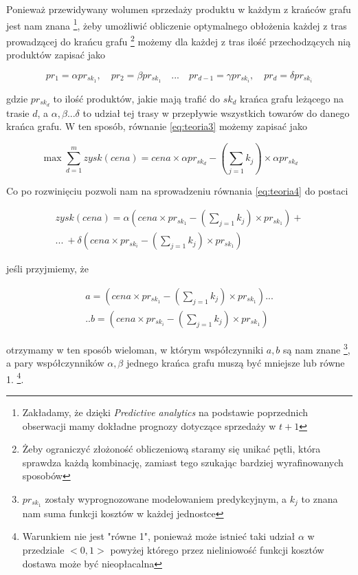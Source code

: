 \documentclass{article}
\begin{document}
Ponieważ przewidywany wolumen sprzedaży produktu w każdym z krańców grafu jest nam znana  \footnote{Zakładamy, że dzięki \textit{Predictive analytics} na podstawie poprzednich obserwacji mamy dokładne prognozy dotyczące sprzedaży w $t+1$}, żeby umożliwić obliczenie optymalnego obłożenia każdej z tras prowadzącej do krańcu grafu \footnote{Żeby ograniczyć złożoność obliczeniową staramy się unikać pętli, która sprawdza każdą kombinację, zamiast tego szukając bardziej wyrafinowanych sposobów} możemy dla każdej z tras ilość przechodzących nią produktów zapisać jako 

\begin{equation*}
pr_1 = \alpha pr_{sk_1} , \quad pr_2 = \beta pr_{sk_1} \quad ... \quad  pr_{d-1} = \gamma pr_{sk_i} ,\quad  pr_d = \delta  pr_{sk_i}
\end{equation*}



gdzie $pr_{sk_d}$ to ilość produktów, jakie mają trafić do $sk_d$ krańca grafu leżącego na trasie $d$, a $\alpha,\beta...\delta$ to udział tej trasy w przepływie wszystkich towarów do danego krańca grafu. W ten sposób, równanie  \ref{eq:teoria3} możemy zapisać jako 

\begin{equation} \label{eq:teoria4}
\max \sum\limits_{d=1}^m  zysk(cena) = 
cena \times \alpha pr_{sk_d}-  ( \sum\limits_{j=1} k_j) \times \alpha pr_{sk_d} \qquad 
\end{equation}

Co po rozwinięciu pozwoli nam na sprowadzeniu równania \ref{eq:teoria4} do postaci

\begin{multline} \label{eq:teoria5}
zysk(cena) = \alpha(cena \times pr_{sk_1} - ( \sum\limits_{j=1} k_j) \times pr_{sk_1}) + \\
 ... \ + \delta(cena \times pr_{sk_i} - ( \sum\limits_{j=1} k_j) \times pr_{sk_1})
\end{multline}


jeśli przyjmiemy, że  

\begin{multline*}
a = (cena \times pr_{sk_1} - ( \sum\limits_{j=1} k_j) \times pr_{sk_1}) ... \\
.. b=(cena \times pr_{sk_i} - ( \sum\limits_{j=1} k_j) \times pr_{sk_1})
\end{multline*}

otrzymamy w ten sposób wieloman, w którym współczynniki $a,b$ są nam znane \footnote{$pr_{sk_1}$ zostały wyprognozowane modelowaniem predykcyjnym, a $k_j$ to znana nam suma funkcji kosztów w każdej jednostce}, a pary współczynników $\alpha, \beta$ jednego krańca grafu muszą być mniejsze lub równe 1. \footnote{Warunkiem nie jest "równe 1", ponieważ może istnieć taki udział $\alpha$ w przedziale $<0,1>$ powyżej którego przez nieliniowość funkcji kosztów dostawa może być nieopłacalna}. 
\end{document}
